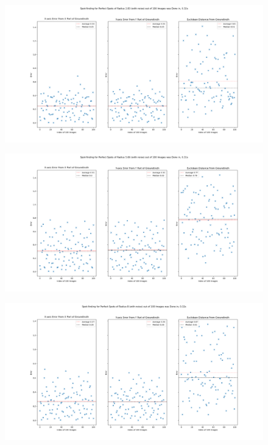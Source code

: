 \documentclass[aps,pra,a4paper,nofootinbib,onecolumn,tightenlines,longbibliography,12pt,amsfonts,amssymb,amsmath,floatfix]{revtex4-2} %
\begin{document}
    \begin{figure}[H]
      \begin{center}
        \includegraphics[width=1.0\textwidth]{project_pics/error_r283_noise.png}
      \end{center}
      \caption{}
      \label{fig:tri_er_r283_noise}
    \end{figure}
    
    \begin{figure}[H]
      \begin{center}
        \includegraphics[width=1.0\textwidth]{project_pics/error_r566_noise.png}
      \end{center}
      \caption{}
      \label{fig:tri_er_r566_noise}
    \end{figure}
    
    \begin{figure}[H]
      \begin{center}
        \includegraphics[width=1.0\textwidth]{project_pics/error_r8_noise.png}
      \end{center}
      \caption{}
      \label{fig:tri_er_r8_noise}
    \end{figure}
    

\end{document}
